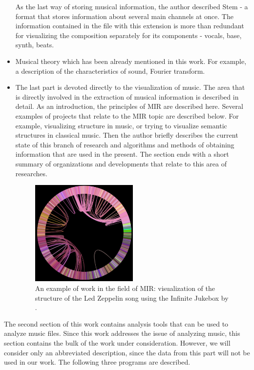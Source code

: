 \documentclass[thesis=B,english]{FITthesis}[2019/12/23]
\begin{document}
\begin{itemize}
As the last way of storing musical information, the author described Stem - a format that stores information about several main channels at once. The information contained in the file with this extension is more than redundant for visualizing the composition separately for its components - vocals, base, synth, beats.

\item Musical theory which has been already mentioned in this work. For example, a description of the characteristics of sound, Fourier transform.

\item The last part is devoted directly to the visualization of music. The area that is directly involved in the extraction of musical information is described in detail. As an introduction, the principles of MIR are described here. Several examples of projects that relate to the MIR topic are described below. For example, visualizing structure in music, or trying to visualize semantic structures in classical music. Then the author briefly describes the current state of this branch of research and algorithms and methods of obtaining information that are used in the present. The section ends with a short summary of organizations and developments that relate to this area of researches.

\begin{figure}[ht]
            \centering
            \includegraphics[width=0.5\textwidth]{structureLedZep.png}
            \caption[Jukebox structure example]{An example of work in the field of MIR: visualization of the structure of the Led Zeppelin song using the Infinite Jukebox by \cite{structurePopMusic}.}
            \label{fig:structureLedZep}
\end{figure}
\end{itemize}

The second section of this work contains analysis tools that can be used to analyze music files. Since this work addresses the issue of analyzing music, this section contains the bulk of the work under consideration. However, we will consider only an abbreviated description, since the data from this part will not be used in our work. The following three programs are described.
\end{document}
